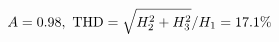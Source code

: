 \documentclass[preview]{standalone}
\begin{document}
\begin{align*}
\special{dvisvgm:raw <g id='unique000'>}A=0.98,\ \text{THD}=\sqrt{H_2^2+H_3^2}/H_1=17.1\%\special{dvisvgm:raw </g>}
\end{align*}
\end{document}
